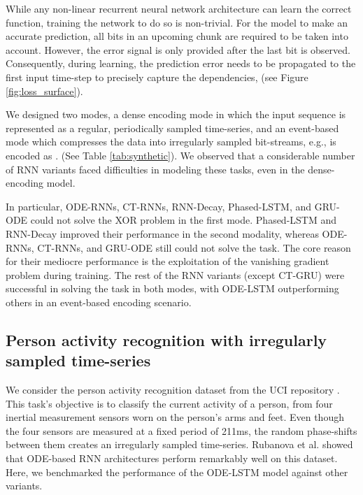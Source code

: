 \documentclass{article}
\begin{document}
While any non-linear recurrent neural network architecture can learn the correct function, training the network to do so is non-trivial. For the model to make an accurate prediction, all bits in an upcoming chunk are required to be taken into account. However, the error signal is only provided after the last bit is observed. Consequently, during learning, the prediction error needs to be propagated to the first input time-step to precisely capture the dependencies, (see Figure \ref{fig:loss_surface}).

We designed two modes, a dense encoding mode in which the input sequence is represented as a regular, periodically sampled time-series, and an event-based mode which compresses the data into irregularly sampled bit-streams, e.g.,  is encoded as . (See Table \ref{tab:synthetic}). We observed that a considerable number of RNN variants faced difficulties in modeling these tasks, even in the dense-encoding model. 

In particular, ODE-RNNs, CT-RNNs, RNN-Decay, Phased-LSTM, and GRU-ODE could not solve the XOR problem in the first mode. Phased-LSTM and RNN-Decay improved their performance in the second modality, whereas ODE-RNNs, CT-RNNs, and GRU-ODE still could not solve the task. The core reason for their mediocre performance is the exploitation of the vanishing gradient problem during training. The rest of the RNN variants (except CT-GRU) were successful in solving the task in both modes, with ODE-LSTM outperforming others in an event-based encoding scenario. 



\subsection{Person activity recognition with irregularly sampled time-series}


We consider the person activity recognition dataset from the UCI repository \cite{dua2019}. This task's objective is to classify the current activity of a person, from four inertial measurement sensors worn on the person's arms and feet. Even though the four sensors are measured at a fixed period of 211ms, the random phase-shifts between them creates an irregularly sampled time-series. Rubanova et al. \cite{rubanova2019latent} showed that ODE-based RNN architectures perform remarkably well on this dataset. Here, we benchmarked the performance of the ODE-LSTM model against other variants.
\end{document}
